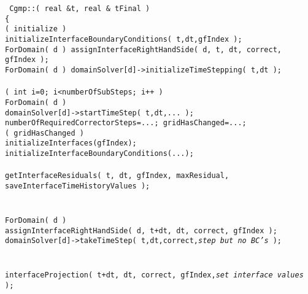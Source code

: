 \begin{flushleft}\tt\small
Cgmp::( real \&t, real \& tFinal ) \\
\{  \\
\ia  \IF( initialize ) \\
\ib    initializeInterfaceBoundaryConditions( t,dt,gfIndex );\\
\ib    ForDomain( d ) assignInterfaceRightHandSide( d, t, dt, correct, gfIndex );\\
\ib    ForDomain( d ) domainSolver[d]->initializeTimeStepping( t,dt );\\
\ia  {}\\
\ia  \FOR( int i=0; i<numberOfSubSteps; i++ )\\
\ib    ForDomain( d )\\
\ic      domainSolver[d]->startTimeStep( t,dt,... );\\
\ic      numberOfRequiredCorrectorSteps=...; gridHasChanged=...; \\ 
\ib    \IF( gridHasChanged ) \\
\ic      initializeInterfaces(gfIndex); initializeInterfaceBoundaryConditions(...); \\
\ib    {} \\
\ib    getInterfaceResiduals( t, dt, gfIndex, maxResidual, saveInterfaceTimeHistoryValues ); \\
\ib \\
\ic       {} \\
\ic       ForDomain( d )  \\
\id         assignInterfaceRightHandSide( d, t+dt, dt, correct, gfIndex ); \\
\id         domainSolver[d]->takeTimeStep( t,dt,correct,{\em\green step but no BC's} );  \\
\ic \\
\ic       {} \\
\ic       interfaceProjection( t+dt, dt, correct, gfIndex,{\em\green set interface values} ); \\
\ic \\
\ic       {} \\

\end{flushleft}
